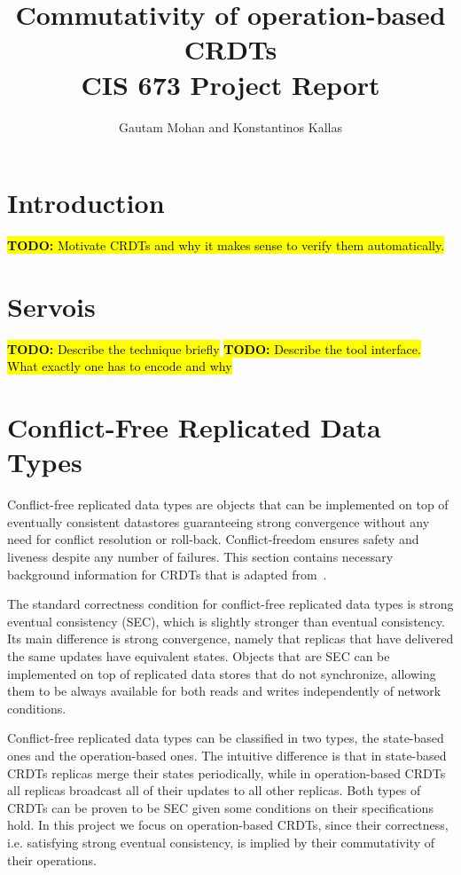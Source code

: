 \documentclass{article}
\newcommand{\TODO}[1]{\hl{\textbf{TODO:} #1}\xspace}
\begin{document}
\title{Commutativity of operation-based CRDTs \\ CIS 673 Project Report}
\author{Gautam Mohan and Konstantinos Kallas}


\maketitle

\section{Introduction}

\TODO{Motivate CRDTs and why it makes sense to verify them
  automatically.}

\section{Servois}

\TODO{Describe the technique briefly} \TODO{Describe the tool
  interface. What exactly one has to encode and why}

\section{Conflict-Free Replicated Data Types}

Conflict-free replicated data types are objects that can be
implemented on top of eventually consistent datastores guaranteeing
strong convergence without any need for conflict resolution or
roll-back. Conflict-freedom ensures safety and liveness despite any
number of failures. This section contains necessary background
information for CRDTs that is adapted from~\cite{shapiro2011conflict}.

The standard correctness condition for conflict-free replicated data
types is strong eventual consistency (SEC), which is slightly stronger
than eventual consistency. Its main difference is strong convergence,
namely that replicas that have delivered the same updates have
equivalent states. Objects that are SEC can be implemented on top of
replicated data stores that do not synchronize, allowing them to be
always available for both reads and writes independently of network
conditions.

Conflict-free replicated data types can be classified in two types,
the state-based ones and the operation-based ones. The intuitive
difference is that in state-based CRDTs replicas merge their states
periodically, while in operation-based CRDTs all replicas broadcast
all of their updates to all other replicas. Both types of CRDTs can be
proven to be SEC given some conditions on their specifications
hold. In this project we focus on operation-based CRDTs, since their
correctness, i.e. satisfying strong eventual consistency, is implied
by their commutativity of their operations.
\end{document}
